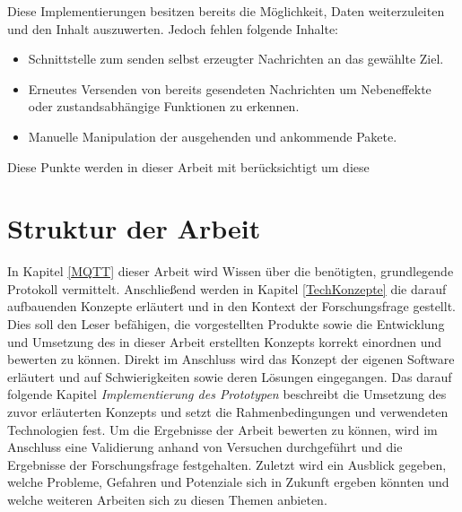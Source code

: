     Diese Implementierungen besitzen bereits die Möglichkeit, Daten weiterzuleiten und den Inhalt auszuwerten. Jedoch fehlen folgende Inhalte:
    \begin{itemize}
        \item Schnittstelle zum senden selbst erzeugter Nachrichten an das gewählte Ziel.
        \item Erneutes Versenden von bereits gesendeten Nachrichten um Nebeneffekte oder zustandsabhängige Funktionen zu erkennen.
        \item Manuelle Manipulation der ausgehenden und ankommende Pakete.
    \end{itemize}
    
    Diese Punkte werden in dieser Arbeit mit berücksichtigt um diese 

\section{Struktur der Arbeit}
    In Kapitel \ref{MQTT} dieser Arbeit wird Wissen über die benötigten, grundlegende Protokoll vermittelt.
    Anschließend werden in Kapitel \ref{TechKonzepte} die darauf aufbauenden Konzepte erläutert und in den Kontext der Forschungsfrage gestellt.
    Dies soll den Leser befähigen, die vorgestellten Produkte sowie die Entwicklung und Umsetzung des in dieser Arbeit erstellten Konzepts korrekt einordnen und bewerten zu können.
    Direkt im Anschluss wird das Konzept der eigenen Software erläutert und auf Schwierigkeiten sowie deren Lösungen eingegangen. Das darauf folgende Kapitel \emph{Implementierung des Prototypen} beschreibt die Umsetzung des zuvor erläuterten Konzepts und setzt die Rahmenbedingungen und verwendeten Technologien fest. Um die Ergebnisse der Arbeit bewerten zu können, wird im Anschluss eine Validierung anhand von Versuchen durchgeführt und die Ergebnisse der Forschungsfrage festgehalten. Zuletzt wird ein Ausblick gegeben, welche Probleme, Gefahren und Potenziale sich in Zukunft ergeben könnten und welche weiteren Arbeiten sich zu diesen Themen anbieten.